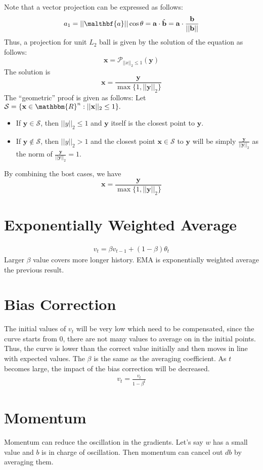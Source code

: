 Note that a vector projection can be expressed as follows:
$$a_1 = ||\malthbf{a}||\cos \theta = \mathbf{a}\cdot \hat{\mathbf{b}} = \mathbf{a}\cdot \frac{\mathbf{b}}{||\mathbf{b}||}$$
Thus, a projection for unit $L_2$ ball is given by the solution of the equation as follows:
$$\mathbf{x} = \mathcal{P}_{||x||_2\leq 1}(\mathbf{y})$$
The solution is
$$\mathbf{x} = \frac{\mathbf{y}}{\max \{1,||\mathbf{y}||_2\}}$$
The ``geometric'' proof is given as follows: Let $\mathcal{S} = \{\mathbf{x}\in \mathbbm{R}^n: ||\mathbf{x}||_2 \leq 1\}.$
\begin{itemize}
		\item If $\mathbf{y}\in \mathcal{S}$, then $||y||_2\leq 1$ and $\mathbf{y}$ itself is the closest point to $\mathbf{y}$.
		\item If $\mathbf{y}\notin \mathcal{S}$, then $||y||_2> 1$ and the closest point $\mathbf{x}\in \mathcal{S}$ to $\mathbf{y}$ will be simply $\frac{\mathbf{y}}{||\mathbf{y}||_2}$ as the norm of $\frac{\mathbf{y}}{||\mathbf{y}||_2}=1$.
\end{itemize}
By combining the bost cases, we have
$$\mathbf{x} = \frac{\mathbf{y}}{\max \{1,||\mathbf{y}||_2\}}$$


\section{Exponentially Weighted Average}
\begin{align*}
    v_t = \beta v_{t-1} + (1-\beta) \theta_t
\end{align*}
Larger $\beta$ value covers more longer history. EMA is exponentially weighted average the previous result. 

\section{Bias Correction}
The initial values of $v_t$ will be very low which need to be compensated, since the curve starts from 0, there are not many values to average on in the initial points. Thus, the curve is lower than the correct value initially and then moves in line with expected values. The $\beta$ is the same as the averaging coefficient. As $t$ becomes large, the impact of the bias correction will be decreased. 
\begin{align*}
    v_t = \frac{v_t}{1-\beta^t}
\end{align*}


\section{Momentum}
Momentum can reduce the oscillation in the gradients. Let's say $w$ has a small value and $b$ is in charge of oscillation. Then momentum can cancel out $db$ by averaging them. 

